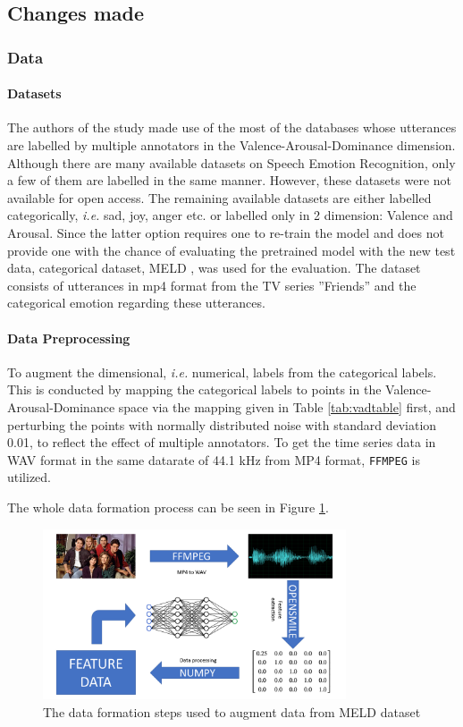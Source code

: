 \documentclass[a4paper,11pt]{article}
\begin{document}
\subsection{Changes made}

\subsubsection{Data}

\paragraph{Datasets}

The authors of the study made use of the most of the databases whose utterances are labelled by multiple annotators in the Valence-Arousal-Dominance dimension. 
Although there are many available datasets on Speech Emotion Recognition, only a few of them are labelled in the same manner. However, these datasets were not available for open access. The remaining available datasets are either labelled categorically, \textit{i.e.} sad, joy, anger etc. or labelled only in 2 dimension: Valence and Arousal. Since the latter option requires one to re-train the model and does not provide one with the chance of evaluating the pretrained model with the new test data, categorical dataset, MELD \cite{atmaja2020deep}, was used for the evaluation. The dataset consists of utterances in mp4 format from the TV series ''Friends'' and the categorical emotion regarding these utterances. 

\paragraph{Data Preprocessing}

To augment the dimensional, \textit{i.e.} numerical, labels from the categorical labels. This is conducted by mapping the categorical labels to points in the Valence-Arousal-Dominance space via the mapping given in Table \ref{tab:vadtable} first, and perturbing the points with normally distributed noise with standard deviation 0.01, to reflect the effect of multiple annotators. To get the time series data in WAV format in the same datarate of 44.1 kHz from MP4 format, \texttt{FFMPEG} is utilized.   

The whole data formation process can be seen in Figure \ref{fig:dataformation}.

\begin{figure}[h]
\centering
\includegraphics[width=0.8\textwidth]{Presentation.png}
\caption{The data formation steps used to augment data from MELD dataset}\label{fig:dataformation}
\end{figure}
\end{document}
